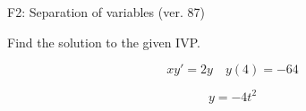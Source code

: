 \begin{exercise}
  \begin{exerciseTitle}F2: Separation of variables (ver. 87)\end{exerciseTitle}
  \begin{exerciseStatement}
    
Find the solution to the given IVP.

    
\[xy'= 2 y \hspace{1em} y( 4 ) = -64\]

  \end{exerciseStatement}
  \begin{exerciseAnswer}
    
\[y= -4 t^ 2\]

  \end{exerciseAnswer}
\end{exercise}